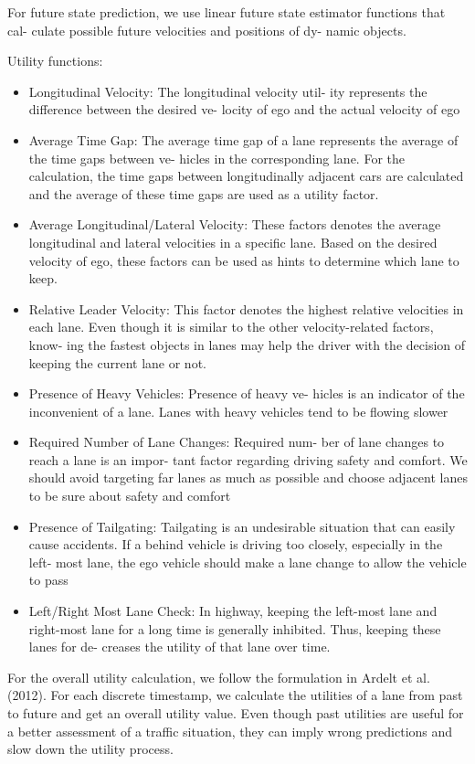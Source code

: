 \documentclass{article}
\begin{document}
For future state prediction,
we use linear future state estimator functions that cal-
culate possible future velocities and positions of dy-
namic objects. 

Utility functions: 
\begin{itemize}
\item Longitudinal Velocity: The longitudinal velocity util-
ity represents the difference between the desired ve-
locity of ego and the actual velocity of ego 
\item Average Time Gap: The average time gap of a lane
represents the average of the time gaps between ve-
hicles in the corresponding lane. For the calculation,
the time gaps between longitudinally adjacent cars are
calculated and the average of these time gaps are used
as a utility factor.
\item Average Longitudinal/Lateral Velocity: These factors
denotes the average longitudinal and lateral velocities
in a specific lane. Based on the desired velocity of
ego, these factors can be used as hints to determine
which lane to keep.
\item Relative Leader Velocity: This factor denotes the
highest relative velocities in each lane. Even though it
is similar to the other velocity-related factors, know-
ing the fastest objects in lanes may help the driver
with the decision of keeping the current lane or not.
\item Presence of Heavy Vehicles: Presence of heavy ve-
hicles is an indicator of the inconvenient of a lane.
Lanes with heavy vehicles tend to be flowing slower
\item Required Number of Lane Changes: Required num-
ber of lane changes to reach a lane is an impor-
tant factor regarding driving safety and comfort. We
should avoid targeting far lanes as much as possible
and choose adjacent lanes to be sure about safety and
comfort
\item Presence of Tailgating: Tailgating is an undesirable
situation that can easily cause accidents. If a behind
vehicle is driving too closely, especially in the left-
most lane, the ego vehicle should make a lane change
to allow the vehicle to pass
\item Left/Right Most Lane Check: In highway, keeping the
left-most lane and right-most lane for a long time is
generally inhibited. Thus, keeping these lanes for de-
creases the utility of that lane over time.

\end{itemize}
For the overall utility calculation, we follow the
formulation in Ardelt et al. (2012). For each discrete
timestamp, we calculate the utilities of a lane from
past to future and get an overall utility value. Even
though past utilities are useful for a better assessment
of a traffic situation, they can imply wrong predictions
and slow down the utility process. 
\end{document}
